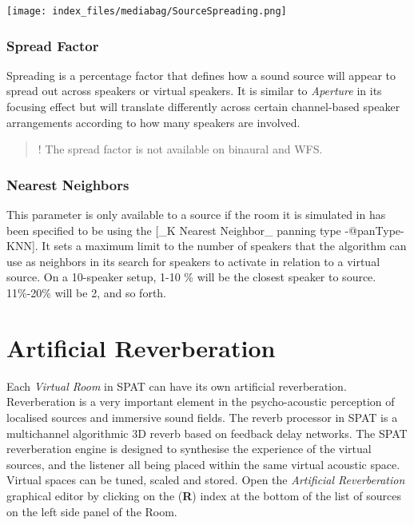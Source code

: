 \documentclass[
  letterpaper,
  DIV=11,
  numbers=noendperiod]{scrreport}
\begin{document}
\texttt{[image: index\_files/mediabag/SourceSpreading.png]}

\hypertarget{spread-factor}{%
\subsection{Spread Factor}\label{spread-factor}}

Spreading is a percentage factor that defines how a sound source will
appear to spread out across speakers or virtual speakers. It is similar
to \emph{Aperture} in its focusing effect but will translate differently
across certain channel-based speaker arrangements according to how many
speakers are involved.

\begin{quote}
! The spread factor is not available on binaural and WFS.
\end{quote}

\hypertarget{nearest-neighbors}{%
\subsection{Nearest Neighbors}\label{nearest-neighbors}}

This parameter is only available to a source if the room it is simulated
in has been specified to be using the {[}\_K Nearest Neighbor\_ panning
type -@panType-KNN{]}. It sets a maximum limit to the number of speakers
that the algorithm can use as neighbors in its search for speakers to
activate in relation to a virtual source. On a 10-speaker setup, 1-10 \%
will be the closest speaker to source. 11\%-20\% will be 2, and so
forth.

\hypertarget{artificial-reverberation}{%
\chapter{Artificial Reverberation}\label{artificial-reverberation}}

Each \emph{Virtual Room} in SPAT can have its own artificial
reverberation. Reverberation is a very important element in the
psycho-acoustic perception of localised sources and immersive sound
fields. The reverb processor in SPAT is a multichannel algorithmic 3D
reverb based on feedback delay networks. The SPAT reverberation engine
is designed to synthesise the experience of the virtual sources, and the
listener all being placed within the same virtual acoustic space.
Virtual spaces can be tuned, scaled and stored. Open the
\emph{Artificial Reverberation} graphical editor by clicking on the
(\textbf{R}) index at the bottom of the list of sources on the left side
panel of the Room.
\end{document}
